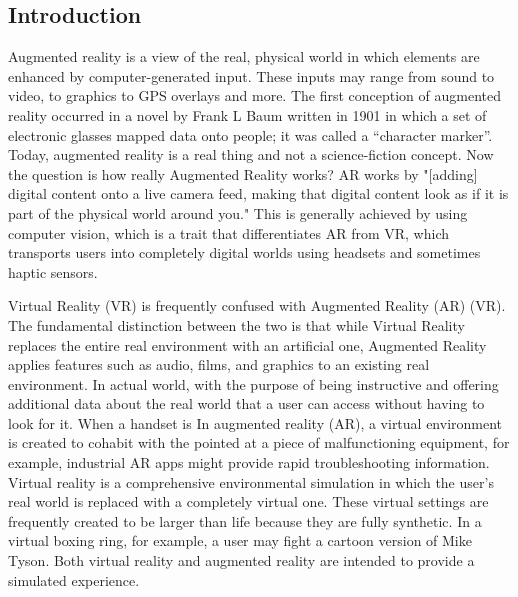 \documentclass[12pt]{article}
\begin{document}
\subsection{Introduction}
Augmented reality is a view of the real, physical world in which elements are enhanced by computer-generated input. These inputs may range from sound to video, to graphics to GPS overlays and more. The first conception of augmented reality occurred in a novel by Frank L Baum written in 1901 in which a set of electronic glasses mapped data onto people; it was called a “character marker”. Today, augmented reality is a real thing and not a science-fiction concept.
Now the question is how really Augmented Reality works?
                                                 AR works by "[adding] digital content onto a live camera feed, making that digital content look as if it is part of the physical world around you."
This is generally achieved by using computer vision, which is a trait that differentiates AR from VR, which transports users into completely digital worlds using headsets and sometimes haptic sensors.


                                                            
                                                            
                                                            Virtual Reality (VR) is frequently confused with Augmented Reality (AR) (VR). The fundamental distinction between the two is that while Virtual Reality replaces the entire real environment with an artificial one, Augmented Reality applies features such as audio, films, and graphics to an existing real environment.
In actual world, with the purpose of being instructive and offering additional data about the real world that a user can access without having to look for it. When a handset is In augmented reality (AR), a virtual environment is created to cohabit with the pointed at a piece of malfunctioning equipment, for example, industrial AR apps might provide rapid troubleshooting information.
Virtual reality is a comprehensive environmental simulation in which the user's real world is replaced with a completely virtual one. These virtual settings are frequently created to be larger than life because they are fully synthetic. In a virtual boxing ring, for example, a user may fight a cartoon version of Mike Tyson.
            Both virtual reality and augmented reality are intended to provide a simulated experience.
            
            \clearpage
\end{document}
